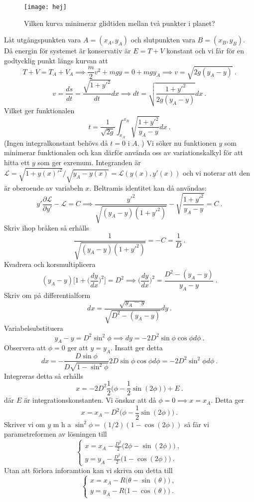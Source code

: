 \documentclass{article}
\begin{document}
\begin{figure}[H]
\begin{center} 
\texttt{[image: hej]}
\caption{Vilken kurva minimerar glidtiden mellan två punkter i planet?}
\label{fig:fig1}
\end{center}
\end{figure}
Låt utgångspunkten vara $A=(x_A,y_A)$ och slutpunkten vara $B=(x_B,y_B)$. Då energin för systemet är konservativ är $E=T+V$ konstant och vi får för en godtycklig punkt längs kurvan att
$$
T+V=T_A+V_A\implies \frac{m}{2}v^2+mgy=0+mgy_A \implies v=\sqrt{2g(y_A-y)} \ .
$$
$$
v=\frac{ds}{dt}=\frac{\sqrt{1+y'^2}}{dt}dx\implies dt=\sqrt{\frac{1+y'^2}{2g(y_A-y)}}dx \ .
$$
Vilket ger funktionalen
$$
t=\frac{1}{\sqrt{2g}}\int_{x_A}^{x_B}\sqrt{\frac{1+y'^2}{y_A-y}}dx \ .
$$
(Ingen integralkonstant behövs då $t=0$ i $A$. ) Vi söker nu funktionen $y$ som minimerar funktionalen och kan därför använda oss av variationskalkyl för att hitta ett $y$ som ger exremum. Integranden är $\mathcal{L}=\sqrt{1+y(x)'^2}/\sqrt{y_A-y(x)}=\mathcal{L}(y(x),y'(x))$ och vi noterar att den är oberoende av variabeln $x$. Beltramis identitet kan då användas:
$$
y'\frac{\partial\mathcal{L}}{\partial y'}-\mathcal{L}=C \implies \frac{y'^2}{\sqrt{(y_A-y)(1+y'^2)}}-\sqrt{\frac{1+y'^2}{y_A-y}}=C \ .
$$
Skriv ihop bråken så erhålls
$$
\frac{1}{\sqrt{(y_A-y)(1+y'^2)}}=-C=\frac{1}{D} \ .
$$
Kvadrera och korsmultiplicera
$$
(y_A-y)\Big[1+\Big(\frac{dy}{dx}\Big)^2\Big]=D^2\implies \Big(\frac{dy}{dx}\Big)^2=\frac{D^2-(y_A-y)}{y_A-y} \ .
$$
Skriv om på differentialform
$$
dx=\frac{\sqrt{y_A-y}}{\sqrt{D^2-(y_A-y)}}dy \ .
$$
Variabelsubstituera
$$
y_A-y=D^2\sin^2\phi \implies dy=-2D^2\sin\phi\cos\phi d\phi \ .
$$
Observera att $\phi=0$ ger att $y=y_A$. Insatt ger detta
$$
dx=-\frac{D\sin\phi}{D\sqrt{1-\sin^2\phi}}2D\sin\phi\cos\phi d\phi=-2D^2\sin^2\phi d\phi \ .
$$
Integreras detta så erhålls
$$
x=-2D^2\frac{1}{2}\Big(\phi-\frac{1}{2}\sin(2\phi)\Big)+E \ .
$$
där $E$ är integrationskonstanten. Vi önskar att då $\phi=0\implies x=x_A$. Detta ger
$$
x=x_A-D^2\Big(\phi-\frac{1}{2}\sin(2\phi)\Big) \ .
$$
Skriver vi om $y$ m h a $\sin^2\phi=(1/2)(1-\cos(2\phi))$ så får vi parametreformen av lösningen till
\begin{equation*}
    \begin{cases}
    x=x_A-\frac{D^2}{2}\big(2\phi-\sin(2\phi)\big) \ ,\\
    y=y_A-\frac{D^2}{2}\big(1-\cos(2\phi)\big) \ .
    \end{cases}
\end{equation*}
Utan att förlora inforamtion kan vi skriva om detta till
\begin{equation}\label{eq:brachpar}
    \begin{cases}
    x=x_A-R\big(\theta-\sin(\theta)\big) \ ,\\
    y=y_A-R\big(1-\cos(\theta)\big) \ .
    \end{cases}
\end{equation}
\end{document}
